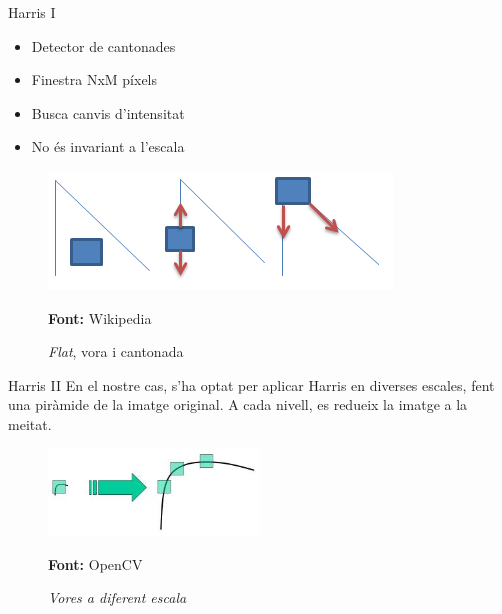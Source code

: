 \documentclass[xcolor=table, 11pt]{beamer}
\newcommand*{\captionsource}[2]{%
  \caption[{#1}]{#1}\par
  \vspace{-0.4cm}
  \tiny{\textbf{Font:} #2\par}}
\newcommand\tz{\fontsize{13}{15.6}\selectfont}
\begin{document}
	\begin{frame}{Harris I}
		\tz
		\begin{minipage}{0.53\textwidth}
			\begin{itemize}
				\item Detector de cantonades
				\item Finestra NxM píxels
				\item Busca canvis d'intensitat
				\item \alert{No és invariant a l'escala}
			\end{itemize}
		\end{minipage}
		\hfill
		\begin{minipage}{0.45\textwidth}
			\begin{figure}[H]
				\includegraphics[width=\textwidth]{images/harris}
				\captionsource{\textit{Flat}, vora i cantonada\vspace{0.1cm}}{Wikipedia}
			\end{figure}
		\end{minipage}
	\end{frame}

	\begin{frame}{Harris II}
		\tz
		En el nostre cas, s'ha optat per aplicar Harris en diverses escales, fent una piràmide de la imatge original. A cada nivell, es redueix la imatge a la meitat.
		\begin{figure}[H]
			\centering
			\includegraphics[width=0.5\textwidth]{images/scale_invariant}
			\captionsource{\textit{Vores a diferent escala}}{OpenCV}
			\label{fig:vores}
		\end{figure}
	\end{frame}
\end{document}
